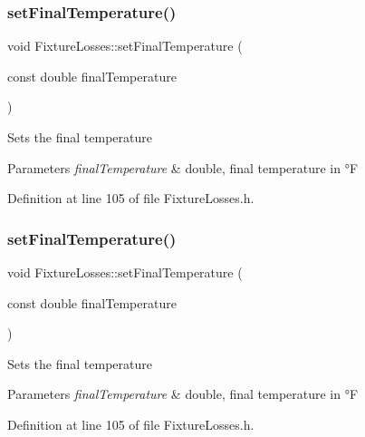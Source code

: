 \subsubsection{\texorpdfstring{set\+Final\+Temperature()}{setFinalTemperature()}\hspace{0.1cm}{\footnotesize\ttfamily [2/3]}}
{\footnotesize\ttfamily void Fixture\+Losses\+::set\+Final\+Temperature (\begin{DoxyParamCaption}\item[{const double}]{final\+Temperature }\end{DoxyParamCaption})\hspace{0.3cm}{\ttfamily [inline]}}

Sets the final temperature 
\begin{DoxyParams}{Parameters}
{\em final\+Temperature} & double, final temperature in °F \\
\hline
\end{DoxyParams}


Definition at line 105 of file Fixture\+Losses.\+h.

\mbox{\label{class_fixture_losses_a5b65e7118cb96c4f4c88c0d6d1a4f6d3}} 
\subsubsection{\texorpdfstring{set\+Final\+Temperature()}{setFinalTemperature()}\hspace{0.1cm}{\footnotesize\ttfamily [3/3]}}
{\footnotesize\ttfamily void Fixture\+Losses\+::set\+Final\+Temperature (\begin{DoxyParamCaption}\item[{const double}]{final\+Temperature }\end{DoxyParamCaption})\hspace{0.3cm}{\ttfamily [inline]}}

Sets the final temperature 
\begin{DoxyParams}{Parameters}
{\em final\+Temperature} & double, final temperature in °F \\
\hline
\end{DoxyParams}


Definition at line 105 of file Fixture\+Losses.\+h.

\mbox{\label{class_fixture_losses_ad3f2a1013dc5da103f2bcfc1357a449b}} 
